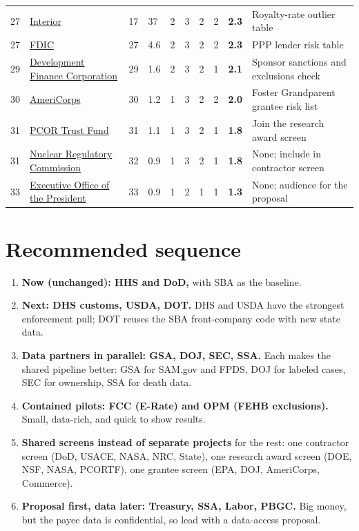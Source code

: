 \documentclass[letterpaper,11pt]{article}
\providecommand{\tightlist}{\setlength{\itemsep}{0pt}\setlength{\parskip}{0pt}}
\begin{document}
\begin{longtable}[l]{@{}l>{\raggedright\arraybackslash}p{}lllllll>{\raggedright\arraybackslash}p{}@{}}
27 & \href{doi.pdf}{Interior} & 17 & 37 & 2 & 3 & 2 & 2 & \textbf{2.3} & Royalty-rate outlier table \\
27 & \href{fdic.pdf}{FDIC} & 27 & 4.6 & 2 & 3 & 2 & 2 & \textbf{2.3} & PPP lender risk table \\
29 & \href{dfc.pdf}{Development Finance Corporation} & 29 & 1.6 & 2 & 3 & 2 & 1 & \textbf{2.1} & Sponsor sanctions and exclusions check \\
30 & \href{cncs.pdf}{AmeriCorps} & 30 & 1.2 & 1 & 3 & 2 & 2 & \textbf{2.0} & Foster Grandparent grantee risk list \\
31 & \href{pcortf.pdf}{PCOR Trust Fund} & 31 & 1.1 & 1 & 3 & 2 & 1 & \textbf{1.8} & Join the research award screen \\
31 & \href{nrc.pdf}{Nuclear Regulatory Commission} & 32 & 0.9 & 1 & 3 & 2 & 1 & \textbf{1.8} & None; include in contractor screen \\
33 & \href{eop.pdf}{Executive Office of the President} & 33 & 0.9 & 1 & 2 & 1 & 1 & \textbf{1.3} & None; audience for the proposal \\
\end{longtable}\endgroup

\hypertarget{recommended-sequence}{%
\section{Recommended sequence}\label{recommended-sequence}}

\begin{enumerate}
\def\labelenumi{\arabic{enumi}.}
\tightlist
\item
  \textbf{Now (unchanged): HHS and DoD,} with SBA as the baseline.
\item
  \textbf{Next: DHS customs, USDA, DOT.} DHS and USDA have the strongest
  enforcement pull; DOT reuses the SBA front-company code with new state
  data.
\item
  \textbf{Data partners in parallel: GSA, DOJ, SEC, SSA.} Each makes the
  shared pipeline better: GSA for SAM.gov and FPDS, DOJ for labeled
  cases, SEC for ownership, SSA for death data.
\item
  \textbf{Contained pilots: FCC (E-Rate) and OPM (FEHB exclusions).}
  Small, data-rich, and quick to show results.
\item
  \textbf{Shared screens instead of separate projects} for the rest: one
  contractor screen (DoD, USACE, NASA, NRC, State), one research award
  screen (DOE, NSF, NASA, PCORTF), one grantee screen (EPA, DOJ,
  AmeriCorps, Commerce).
\item
  \textbf{Proposal first, data later: Treasury, SSA, Labor, PBGC.} Big
  money, but the payee data is confidential, so lead with a data-access
  proposal.
\end{enumerate}
\end{document}
